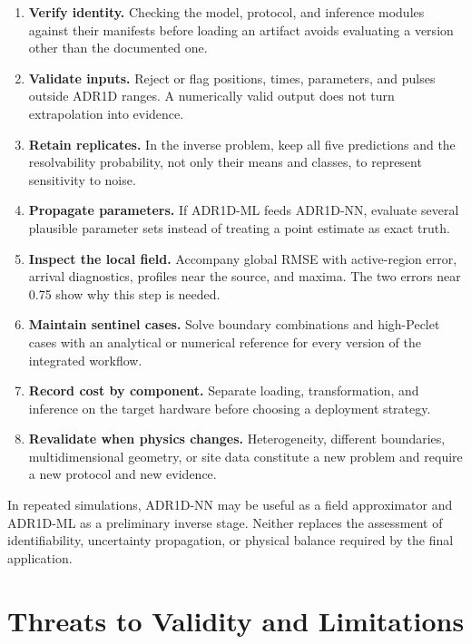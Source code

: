 \documentclass[11pt,a4paper]{article}
\begin{document}
\begin{enumerate}
    \item \textbf{Verify identity.} Checking the model, protocol, and inference
    modules against their manifests before loading an artifact avoids
    evaluating a version other than the documented one.
    \item \textbf{Validate inputs.} Reject or flag positions, times,
    parameters, and pulses outside ADR1D ranges. A numerically valid output
    does not turn extrapolation into evidence.
    \item \textbf{Retain replicates.} In the inverse problem, keep all five
    predictions and the resolvability probability, not only their means and
    classes, to represent sensitivity to noise.
    \item \textbf{Propagate parameters.} If ADR1D-ML feeds ADR1D-NN, evaluate
    several plausible parameter sets instead of treating a point estimate as
    exact truth.
    \item \textbf{Inspect the local field.} Accompany global RMSE with
    active-region error, arrival diagnostics, profiles near the source, and
    maxima. The two errors near 0.75 show why this step is needed.
    \item \textbf{Maintain sentinel cases.} Solve boundary combinations and
    high-Peclet cases with an analytical or numerical reference for every
    version of the integrated workflow.
    \item \textbf{Record cost by component.} Separate loading,
    transformation, and inference on the target hardware before choosing a
    deployment strategy.
    \item \textbf{Revalidate when physics changes.} Heterogeneity, different
    boundaries, multidimensional geometry, or site data constitute a new
    problem and require a new protocol and new evidence.
\end{enumerate}

In repeated simulations, ADR1D-NN may be useful as a field approximator and
ADR1D-ML as a preliminary inverse stage. Neither replaces the assessment of
identifiability, uncertainty propagation, or physical balance required by the
final application.

\section{Threats to Validity and Limitations}
\end{document}
